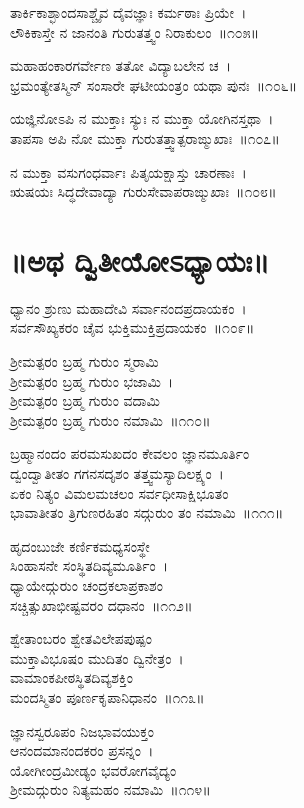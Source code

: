 ತಾರ್ಕಿಕಾಶ್ಛಾಂದಸಾಶ್ಚೈವ ದೈವಜ್ಞಾಃ ಕರ್ಮಠಾಃ ಪ್ರಿಯೇ~।\\
ಲೌಕಿಕಾಸ್ತೇ ನ ಜಾನಂತಿ ಗುರುತತ್ತ್ವಂ ನಿರಾಕುಲಂ~॥೧೦೫॥

ಮಹಾಹಂಕಾರಗರ್ವೇಣ ತತೋ ವಿದ್ಯಾಬಲೇನ ಚ~।\\
ಭ್ರಮಂತ್ಯೇತಸ್ಮಿನ್ ಸಂಸಾರೇ ಘಟೀಯಂತ್ರಂ ಯಥಾ ಪುನಃ~॥೧೦೬॥

ಯಜ್ಞಿನೋಽಪಿ ನ ಮುಕ್ತಾಃ ಸ್ಯುಃ ನ ಮುಕ್ತಾ ಯೋಗಿನಸ್ತಥಾ~।\\
ತಾಪಸಾ ಅಪಿ ನೋ ಮುಕ್ತಾ ಗುರುತತ್ತ್ವಾತ್ಪರಾಙ್ಮುಖಾಃ~॥೧೦೭॥

ನ ಮುಕ್ತಾ ವಸುಗಂಧರ್ವಾಃ ಪಿತೃಯಕ್ಷಾಸ್ತು ಚಾರಣಾಃ~।\\
ಋಷಯಃ ಸಿದ್ಧದೇವಾದ್ಯಾ ಗುರುಸೇವಾಪರಾಙ್ಮುಖಾಃ~॥೧೦೮॥

\section{॥ಅಥ ದ್ವಿತೀಯೋಽಧ್ಯಾಯಃ॥}

ಧ್ಯಾನಂ ಶ್ರುಣು ಮಹಾದೇವಿ ಸರ್ವಾನಂದಪ್ರದಾಯಕಂ~।\\
ಸರ್ವಸೌಖ್ಯಕರಂ ಚೈವ ಭುಕ್ತಿಮುಕ್ತಿಪ್ರದಾಯಕಂ~॥೧೦೯॥

ಶ್ರೀಮತ್ಪರಂ ಬ್ರಹ್ಮ ಗುರುಂ ಸ್ಮರಾಮಿ\\ ಶ್ರೀಮತ್ಪರಂ ಬ್ರಹ್ಮ ಗುರುಂ ಭಜಾಮಿ~।\\
ಶ್ರೀಮತ್ಪರಂ ಬ್ರಹ್ಮ ಗುರುಂ ವದಾಮಿ\\ ಶ್ರೀಮತ್ಪರಂ ಬ್ರಹ್ಮ ಗುರುಂ ನಮಾಮಿ~॥೧೧೦॥

ಬ್ರಹ್ಮಾನಂದಂ ಪರಮಸುಖದಂ ಕೇವಲಂ ಜ್ಞಾನಮೂರ್ತಿಂ\\
ದ್ವಂದ್ವಾತೀತಂ ಗಗನಸದೃಶಂ ತತ್ತ್ವಮಸ್ಯಾದಿಲಕ್ಷ್ಯಂ~।\\
ಏಕಂ ನಿತ್ಯಂ ವಿಮಲಮಚಲಂ ಸರ್ವಧೀಸಾಕ್ಷಿಭೂತಂ\\
ಭಾವಾತೀತಂ ತ್ರಿಗುಣರಹಿತಂ ಸದ್ಗುರುಂ ತಂ ನಮಾಮಿ~॥೧೧೧॥

ಹೃದಂಬುಜೇ ಕರ್ಣಿಕಮಧ್ಯಸಂಸ್ಥೇ\\ ಸಿಂಹಾಸನೇ ಸಂಸ್ಥಿತದಿವ್ಯಮೂರ್ತಿಂ~।\\
ಧ್ಯಾಯೇದ್ಗುರುಂ ಚಂದ್ರಕಲಾಪ್ರಕಾಶಂ\\ ಸಚ್ಚಿತ್ಸುಖಾಭೀಷ್ಟವರಂ ದಧಾನಂ~॥೧೧೨॥

ಶ್ವೇತಾಂಬರಂ ಶ್ವೇತವಿಲೇಪಪುಷ್ಪಂ\\ ಮುಕ್ತಾವಿಭೂಷಂ ಮುದಿತಂ ದ್ವಿನೇತ್ರಂ~।\\
ವಾಮಾಂಕಪೀಠಸ್ಥಿತದಿವ್ಯಶಕ್ತಿಂ\\ ಮಂದಸ್ಮಿತಂ ಪೂರ್ಣಕೃಪಾನಿಧಾನಂ~॥೧೧೩॥

ಜ್ಞಾನಸ್ವರೂಪಂ ನಿಜಭಾವಯುಕ್ತಂ\\ ಆನಂದಮಾನಂದಕರಂ ಪ್ರಸನ್ನಂ~।\\
ಯೋಗೀಂದ್ರಮೀಡ್ಯಂ ಭವರೋಗವೈದ್ಯಂ\\ ಶ್ರೀಮದ್ಗುರುಂ ನಿತ್ಯಮಹಂ ನಮಾಮಿ~॥೧೧೪॥

